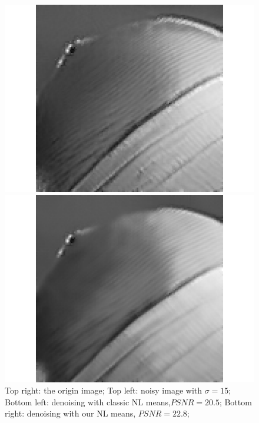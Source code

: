 \documentclass[runningheads]{llncs}
\begin{document}
\begin{figure}[!h]
\begin{minipage}{0.45\linewidth}
    \includegraphics[width=\linewidth]{hat_eucli}
    \end{minipage}
    \begin{minipage}{0.45\linewidth}
    \includegraphics[width=\linewidth]{hat_our}
    \end{minipage}
      \caption{Top right: the origin image; Top left: noisy image with $\sigma=15$; Bottom left: denoising with classic NL means,$PSNR=20.5$; Bottom right: denoising with our NL means, $PSNR=22.8$;}
      \label{lena_de}
  \end{figure}  
  
\end{document}
